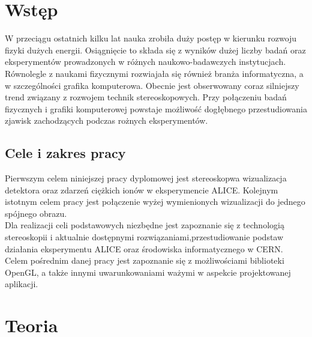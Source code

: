 \documentclass[paper=a4, fontsize=11pt]{scrartcl} %
\begin{document}
\newpage

\section{Wstęp}
W przeciągu ostatnich kilku lat nauka zrobiła duży postęp w kierunku rozwoju fizyki dużych energii. Osiągnięcie to składa się z wyników dużej liczby badań oraz eksperymentów prowadzonych w różnych naukowo-badawczych instytucjach. Równolegle z naukami fizycznymi rozwiajała się również branża informatyczna, a w szczególności grafika komputerowa. Obecnie jest obserwowany coraz silniejszy trend związany z rozwojem technik stereoskopowych. Przy połączeniu badań fizycznych i grafiki komputerowej powstaje możliwość dogłębnego przestudiowania zjawisk zachodzących podczas rożnych eksperymentów.


\subsection{Cele i zakres pracy}
Pierwszym celem niniejszej pracy dyplomowej jest stereoskopwa wizualizacja detektora oraz zdarzeń ciężkich ionów w eksperymencie ALICE. Kolejnym istotnym celem pracy jest połączenie wyżej wymienionych wizualizacji do jednego spójnego obrazu. \\
Dla realizacji celi podstawowych niezbędne jest zapoznanie się z technologią stereoskopii i aktualnie dostępnymi rozwiązaniami,przestudiowanie podstaw działania eksperymentu ALICE oraz środowiska informatycznego w CERN. \\
Celem pośrednim danej pracy jest zapoznanie się z możliwościami biblioteki OpenGL, a także innymi uwarunkowaniami ważymi w aspekcie projektowanej aplikacji.
\newpage
\section{Teoria}
\end{document}
